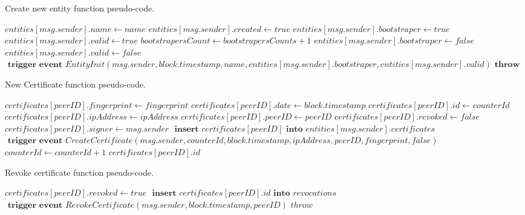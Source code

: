 \begin{algorithm}
  \caption{Create new entity function pseudo-code.}
  \label{alg:create-entity}
  \begin{algorithmic}[1]
        \State $entities[msg.sender].name \gets name$
        \State $entities[msg.sender].created \gets true$
        \State
          \State $entities[msg.sender].bootstraper \gets  true$
          \State $entities[msg.sender].valid \gets true$
          \State $bootstrapersCount \gets bootstrapersCounts + 1$
        \Else
          \State $entities[msg.sender].bootstraper \gets  false$
          \State $entities[msg.sender].valid \gets false$
        \EndIf
          \State
          \State $\textbf{ trigger event } EntityInit(msg.sender, block.timestamp,\allowbreak name, entities[msg.sender].bootstraper, entities[msg.sender].valid)$
      \Else
        \State $\textbf{throw}$
      \EndIf
    \EndFunction
  \end{algorithmic}
\end{algorithm}

\begin{algorithm}
  \caption{New Certificate function pseudo-code.}
\label{alg:new-certificate}
  \begin{algorithmic}[1]
      \State $certificates[peerID].fingerprint \gets fingerprint$
      \State $certificates[peerID].date \gets block.timestamp$
      \State $certificates[peerID].id \gets counterId$
      \State $certificates[peerID].ipAddress \gets ipAddress$
      \State $certificates[peerID].peerID \gets peerID$
      \State $certificates[peerID].revoked \gets false$
      \State $certificates[peerID].signer \gets msg.sender$
      \State 
      \State $\textbf{ insert } certificates[peerID] \textbf{ into } entities[msg.sender].certificates$
      \State 
      \State $\textbf{ trigger event } CreateCertificate(msg.sender, counterId, block.timestamp,\allowbreak ipAddress, peerID, fingerprint, false)$
      \State
      \State $counterId \gets counterId + 1$
      \State 
      \State 
      \Return $certificates[peerID].id$
    \EndFunction
  \end{algorithmic}
\end{algorithm}

\begin{algorithm}
  \caption{Revoke certificate function pseudo-code.}
  \label{alg:revoke-certificate}
  \begin{algorithmic}[1]
        \State $certificates[peerID].revoked \gets true$
        \State $\textbf{ insert } certificates[peerID].id \textbf{ into } revocations$
        \State $\textbf{ trigger event } RevokeCertificate(msg.sender, block.timestamp, peerID)$
      \Else
        \State $throw$
      \EndIf
    \EndFunction
  \end{algorithmic}
\end{algorithm}

